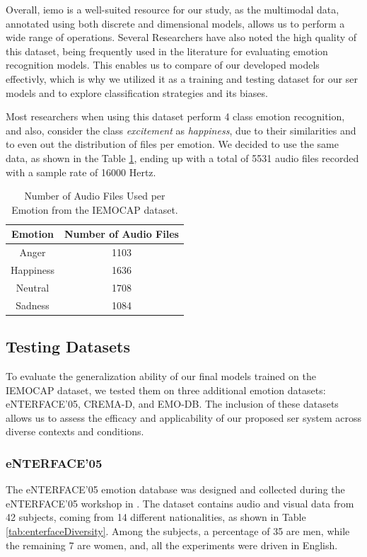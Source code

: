 Overall, \ac{iemo} is a well-suited resource for our study, as the multimodal data, annotated using both discrete and dimensional models, allows us to perform a wide range of operations. Several Researchers have also noted the high quality of this dataset, being frequently used in the literature for evaluating emotion recognition models. This enables us to compare of our developed models effectivly, which is why we utilized it as a training and testing dataset for our \ac{ser} models and to explore classification strategies and its biases.

Most researchers when using this dataset perform 4 class emotion recognition, and also, consider the class \textit{excitement} as \textit{happiness}, due to their similarities and to even out the distribution of files per emotion. We decided to use the same data, as shown in the Table \ref{tab:dataDist}, ending up with a total of 5531 audio files recorded with a sample rate of 16000 Hertz.

\begin{table}[H]
	\centering
	\caption{Number of Audio Files Used per Emotion from the IEMOCAP dataset.}
	\label{tab:dataDist}
	\begin{tabular}{cc}
		\toprule
		Emotion & Number of Audio Files \\
		\midrule
		Anger 		&  1103\\
		Happiness 	&  1636\\
		Neutral	 	&  1708\\
		Sadness 	&  1084\\
		\bottomrule
	\end{tabular}
\end{table}


\subsection{Testing Datasets}

To evaluate the generalization ability of our final models trained on the IEMOCAP dataset, we tested them on three additional emotion datasets: eNTERFACE’05, CREMA-D, and EMO-DB. The inclusion of these datasets allows us to assess the efficacy and applicability of our proposed \ac{ser} system across diverse contexts and conditions.

\subsubsection{eNTERFACE'05}

The eNTERFACE’05 emotion database \cite{Martin2006} was designed and collected during the eNTERFACE’05 workshop in \citeyear{Martin2006}. The dataset contains audio and visual data from 42 subjects, coming from 14 different nationalities, as shown in Table \ref{tab:enterfaceDiversity}. Among the subjects, a percentage of 35 are men, while the remaining 7 are women, and, all the experiments were driven in English.

